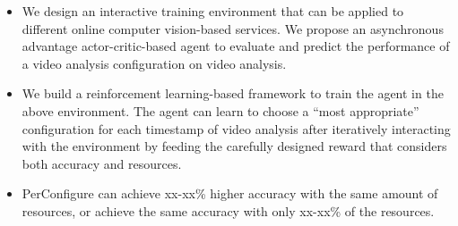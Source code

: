 \begin{itemize}
	
\item We design an interactive training environment that can be applied to different online computer vision-based services. We propose an asynchronous advantage actor-critic-based \cite{mnih2016asynchronous} agent to evaluate and predict the performance of a video analysis configuration on video analysis.

\item We build a reinforcement learning-based framework to train the agent in the above environment. The agent can learn to choose a ``most appropriate'' configuration for each timestamp of video analysis after iteratively interacting with the environment by feeding the carefully designed reward that considers both accuracy and resources.
 
\item PerConfigure can achieve xx-xx\% higher accuracy with the
same amount of resources, or achieve the same accuracy
with only xx-xx\% of the resources.
\end{itemize}

